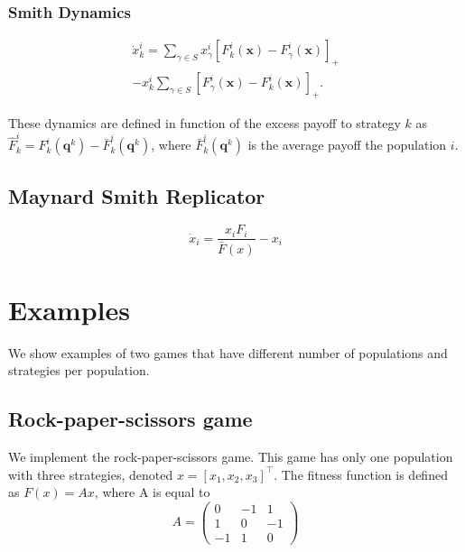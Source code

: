\documentclass[a4paper,10pt]{article}
\newcommand{\bs}[1]{\boldsymbol{#1}}
\begin{document}
\subsubsection{Smith Dynamics}
\begin{multline}
\dot{x}_k^i  = \sum_{\gamma \in S} x_\gamma^i  \left[ F_k^i \left( \bs{x} \right) - F_\gamma^i \left( \bs{x} \right) \right]_+ 
\\
- x_k^i  \sum_{\gamma \in S} \left[ F_\gamma^i ( \bs{x}) - F_k^i( \bs{x} ) \right]_+.
\label{eq:smith}
\end{multline}



These dynamics are defined in function of the excess payoff to strategy $k$ as $\hat{F}_k^i =  F_k^i(\bs{q}^k) - \bar{F}_k^i(\bs{q}^k)$,
where $\bar{F}_k^i(\bs{q}^k)$ is the average payoff the population $i$.







\subsection{Maynard Smith Replicator}

\begin{equation}
\dot{x}_i = \frac{ x_i F_i }{ \bar{F}(x) } - x_i
\end{equation}






\section{Examples}
We show examples of two games that have different number of populations and strategies per population.

\subsection{Rock-paper-scissors game}
We implement the rock-paper-scissors game. This game has only one population with three strategies, denoted $x = [x_1, x_2, x_3]^\top$. The fitness function is defined as $F(x)=Ax$, where A is equal to 
\begin{equation}
  A = \begin{pmatrix}
  0  & -1 &  1 \\
  1  &  0 & -1 \\
  -1 &  1 & 0
  \end{pmatrix}
\end{equation}
\end{document}
